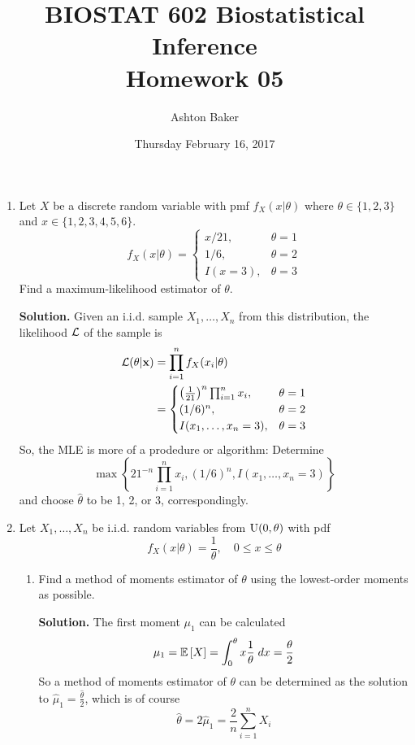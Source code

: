 \documentclass[titlepage]{article}
\begin{document}
\title{BIOSTAT 602 Biostatistical Inference\\Homework 05}
\author{Ashton Baker}
\date{Thursday February 16, 2017}
\maketitle
\begin{enumerate}
\item Let $X$ be a discrete random variable with pmf $f_X(x|\theta)$ where $\theta \in \{1, 2, 3\}$ and $x \in \{1, 2, 3, 4, 5, 6\}$.
  \[f_X(x|\theta) =
  \begin{cases}
  x/21, & \theta = 1 \\
  1/6, & \theta = 2 \\
  I(x = 3), & \theta = 3
  \end{cases}\]
Find a maximum-likelihood estimator of $\theta$.

\textbf{Solution.} Given an i.i.d. sample $X_1, \ldots, X_n$ from this distribution, the likelihood $\mathcal{L}$ of the sample is
  \[\begin{aligned}
  \mathcal{L}(\theta | \mathbf{x}) &= \prod_{i=1}^n f_X(x_i|\theta) \\
  &= \begin{cases}
     \left(\frac{1}{21}\right)^n \prod_{i=1}^n x_i, & \theta = 1 \\
     (1/6)^n, & \theta = 2 \\
     I(x_1, \ldots, x_n = 3), & \theta = 3
     \end{cases}
  \end{aligned}\]
  So, the MLE is more of a prodedure or algorithm: Determine
  \[\max\left\{21^{-n}\prod_{i=1}^n x_i, (1/6)^n, I(x_1, \ldots, x_n = 3)\right\}\]
  and choose $\hat{\theta}$ to be 1, 2, or 3, correspondingly.

\item Let $X_1, \ldots, X_n$ be i.i.d. random variables from $\text{U}(0, \theta)$ with pdf
  \[f_X(x|\theta) = \frac{1}{\theta}, \quad 0 \leq x \leq \theta\]

  \begin{enumerate}
  \item Find a method of moments estimator of $\theta$ using the lowest-order moments as possible.

  \textbf{Solution.} The first moment $\mu_1$ can be calculated
    \[\mu_1 = \mathbb{E}\left[ X \right] = \int_0^\theta x \frac{1}{\theta} \; dx = \frac{\theta}{2}\]
  So a method of moments estimator of $\theta$ can be determined as the solution to $\hat{\mu}_1 = \frac{\hat{\theta}}{2}$, which is of course
  \[\hat{\theta} = 2\hat{\mu}_1 = \frac{2}{n}\sum_{i=1}^n X_i\]


\end{enumerate}
\end{enumerate}
\end{document}
